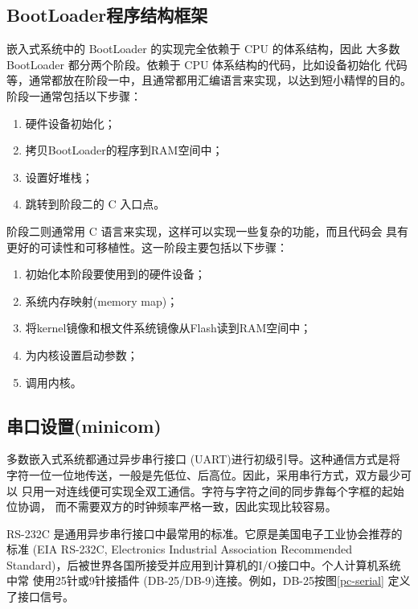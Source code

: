 \subsection{BootLoader程序结构框架}
嵌入式系统中的 BootLoader 的实现完全依赖于 CPU 的体系结构，因此
大多数 BootLoader 都分两个阶段。依赖于 CPU 体系结构的代码，比如设备初始化
代码等，通常都放在阶段一中，且通常都用汇编语言来实现，以达到短小精悍的目的。
阶段一通常包括以下步骤：
\begin{enumerate}
  \item 硬件设备初始化；
  \item 拷贝BootLoader的程序到RAM空间中；
  \item 设置好堆栈；
  \item 跳转到阶段二的 C 入口点。
\end{enumerate}

阶段二则通常用 C 语言来实现，这样可以实现一些复杂的功能，而且代码会
具有更好的可读性和可移植性。这一阶段主要包括以下步骤：
\begin{enumerate}
  \item 初始化本阶段要使用到的硬件设备；
  \item 系统内存映射(memory map)；
  \item 将kernel镜像和根文件系统镜像从Flash读到RAM空间中； 
  \item 为内核设置启动参数；
  \item 调用内核。
\end{enumerate}

\subsection{串口设置(minicom)}
    多数嵌入式系统都通过异步串行接口 (UART)进行初级引导。这种通信方式是将
字符一位一位地传送，一般是先低位、后高位。因此，采用串行方式，双方最少可以
只用一对连线便可实现全双工通信。字符与字符之间的同步靠每个字框的起始位协调，
而不需要双方的时钟频率严格一致，因此实现比较容易。

    RS-232C 是通用异步串行接口中最常用的标准。它原是美国电子工业协会推荐的
标准 (EIA RS-232C, Electronics Industrial Association Recommended
Standard)，后被世界各国所接受并应用到计算机的I/O接口中。个人计算机系统中常
使用25针或9针接插件 (DB-25/DB-9)连接。例如，DB-25按图\ref{pc-serial}
定义了接口信号。


